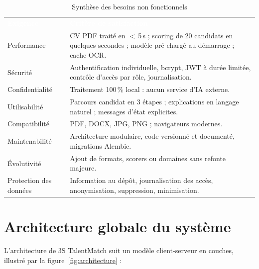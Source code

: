 \documentclass[12pt,a4paper]{report}
\begin{document}
\begin{table}[H]
\centering
\caption{Synthèse des besoins non fonctionnels}
\label{tab:besoins_nf}
\small
\begin{tabularx}{\textwidth}{p{3.4cm} X}
\rowcolor{tabheader}
\textcolor{white}{\textbf{Exigence}} & \textcolor{white}{\textbf{Critère de satisfaction}} \\
Performance      & CV PDF traité en $<$\,5\,s ; scoring de 20 candidats en quelques secondes ; modèle pré-chargé au démarrage ; cache OCR. \\
\rowcolor{tabalt}
Sécurité         & Authentification individuelle, bcrypt, JWT à durée limitée, contrôle d'accès par rôle, journalisation. \\
Confidentialité  & Traitement 100\,\% local : aucun service d'IA externe. \\
\rowcolor{tabalt}
Utilisabilité    & Parcours candidat en 3 étapes ; explications en langage naturel ; messages d'état explicites. \\
Compatibilité    & PDF, DOCX, JPG, PNG ; navigateurs modernes. \\
\rowcolor{tabalt}
Maintenabilité   & Architecture modulaire, code versionné et documenté, migrations Alembic. \\
Évolutivité      & Ajout de formats, scorers ou domaines sans refonte majeure. \\
\rowcolor{tabalt}
Protection des données & Information au dépôt, journalisation des accès, anonymisation, suppression, minimisation. \\
\bottomrule
\end{tabularx}
\end{table}

\section{Architecture globale du système}

L'architecture de 3S TalentMatch suit un modèle client-serveur en couches, illustré par la figure~\ref{fig:architecture} :
\end{document}
